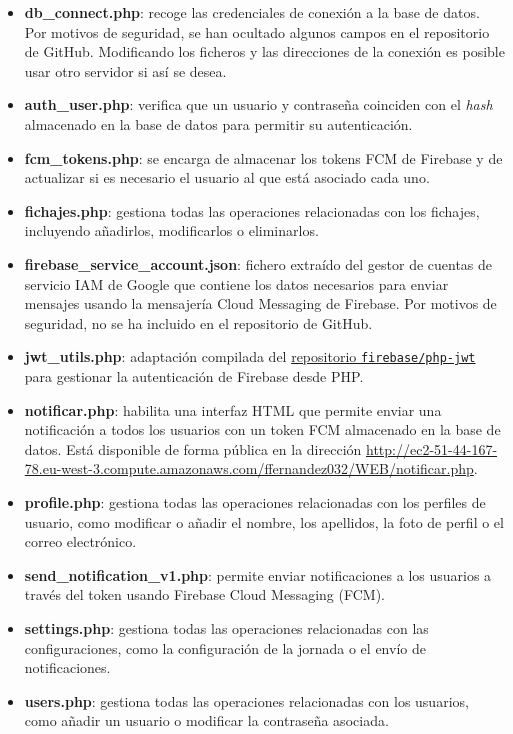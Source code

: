 \begin{itemize}
  \item \textbf{db\_connect.php}: recoge las credenciales de conexión a la base de datos. Por motivos de seguridad, se han ocultado algunos campos en el repositorio de GitHub. Modificando los ficheros y las direcciones de la conexión es posible usar otro servidor si así se desea.
  \item \textbf{auth\_user.php}: verifica que un usuario y contraseña coinciden con el \textit{hash} almacenado en la base de datos para permitir su autenticación.
  \item \textbf{fcm\_tokens.php}: se encarga de almacenar los tokens FCM de Firebase y de actualizar si es necesario el usuario al que está asociado cada uno.
  \item \textbf{fichajes.php}: gestiona todas las operaciones relacionadas con los fichajes, incluyendo añadirlos, modificarlos o eliminarlos.
  \item \textbf{firebase\_service\_account.json}: fichero extraído del gestor de cuentas de servicio IAM de Google que contiene los datos necesarios para enviar mensajes usando la mensajería Cloud Messaging de Firebase. Por motivos de seguridad, no se ha incluido en el repositorio de GitHub.
  \item \textbf{jwt\_utils.php}: adaptación compilada del \href{https://github.com/firebase/php-jwt}{repositorio \texttt{firebase/php-jwt}} para gestionar la autenticación de Firebase desde PHP.
  \item \textbf{notificar.php}: habilita una interfaz HTML que permite enviar una notificación a todos los usuarios con un token FCM almacenado en la base de datos. Está disponible de forma pública en la dirección \url{http://ec2-51-44-167-78.eu-west-3.compute.amazonaws.com/ffernandez032/WEB/notificar.php}.
  \item \textbf{profile.php}: gestiona todas las operaciones relacionadas con los perfiles de usuario, como modificar o añadir el nombre, los apellidos, la foto de perfil o el correo electrónico.
  \item \textbf{send\_notification\_v1.php}: permite enviar notificaciones a los usuarios a través del token usando Firebase Cloud Messaging (FCM).
  \item \textbf{settings.php}: gestiona todas las operaciones relacionadas con las configuraciones, como la configuración de la jornada o el envío de notificaciones.
  \item \textbf{users.php}: gestiona todas las operaciones relacionadas con los usuarios, como añadir un usuario o modificar la contraseña asociada.
\end{itemize}